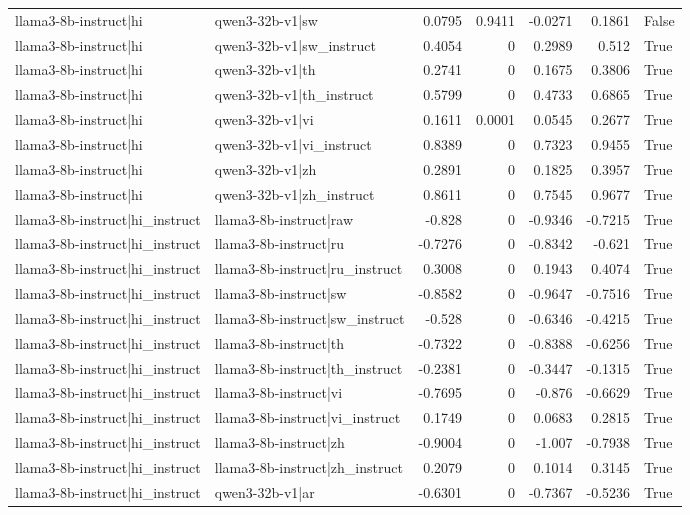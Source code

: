 \begin{table}
\begin{tabular}{l l r r r r l}
llama3-8b-instruct|hi & qwen3-32b-v1|sw & 0.0795 & 0.9411 & -0.0271 & 0.1861 & False \\
llama3-8b-instruct|hi & qwen3-32b-v1|sw_instruct & 0.4054 & 0 & 0.2989 & 0.512 & True \\
llama3-8b-instruct|hi & qwen3-32b-v1|th & 0.2741 & 0 & 0.1675 & 0.3806 & True \\
llama3-8b-instruct|hi & qwen3-32b-v1|th_instruct & 0.5799 & 0 & 0.4733 & 0.6865 & True \\
llama3-8b-instruct|hi & qwen3-32b-v1|vi & 0.1611 & 0.0001 & 0.0545 & 0.2677 & True \\
llama3-8b-instruct|hi & qwen3-32b-v1|vi_instruct & 0.8389 & 0 & 0.7323 & 0.9455 & True \\
llama3-8b-instruct|hi & qwen3-32b-v1|zh & 0.2891 & 0 & 0.1825 & 0.3957 & True \\
llama3-8b-instruct|hi & qwen3-32b-v1|zh_instruct & 0.8611 & 0 & 0.7545 & 0.9677 & True \\
llama3-8b-instruct|hi_instruct & llama3-8b-instruct|raw & -0.828 & 0 & -0.9346 & -0.7215 & True \\
llama3-8b-instruct|hi_instruct & llama3-8b-instruct|ru & -0.7276 & 0 & -0.8342 & -0.621 & True \\
llama3-8b-instruct|hi_instruct & llama3-8b-instruct|ru_instruct & 0.3008 & 0 & 0.1943 & 0.4074 & True \\
llama3-8b-instruct|hi_instruct & llama3-8b-instruct|sw & -0.8582 & 0 & -0.9647 & -0.7516 & True \\
llama3-8b-instruct|hi_instruct & llama3-8b-instruct|sw_instruct & -0.528 & 0 & -0.6346 & -0.4215 & True \\
llama3-8b-instruct|hi_instruct & llama3-8b-instruct|th & -0.7322 & 0 & -0.8388 & -0.6256 & True \\
llama3-8b-instruct|hi_instruct & llama3-8b-instruct|th_instruct & -0.2381 & 0 & -0.3447 & -0.1315 & True \\
llama3-8b-instruct|hi_instruct & llama3-8b-instruct|vi & -0.7695 & 0 & -0.876 & -0.6629 & True \\
llama3-8b-instruct|hi_instruct & llama3-8b-instruct|vi_instruct & 0.1749 & 0 & 0.0683 & 0.2815 & True \\
llama3-8b-instruct|hi_instruct & llama3-8b-instruct|zh & -0.9004 & 0 & -1.007 & -0.7938 & True \\
llama3-8b-instruct|hi_instruct & llama3-8b-instruct|zh_instruct & 0.2079 & 0 & 0.1014 & 0.3145 & True \\
llama3-8b-instruct|hi_instruct & qwen3-32b-v1|ar & -0.6301 & 0 & -0.7367 & -0.5236 & True \\

\end{tabular}
\end{table}
